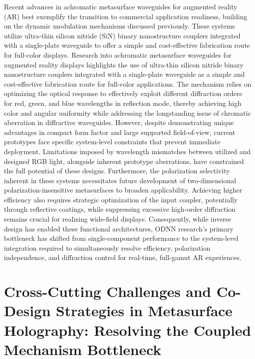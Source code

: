 \documentclass[11pt]{article}
\begin{document}
Recent advances in achromatic metasurface waveguides for augmented reality (AR) best exemplify the transition to commercial application readiness, building on the dynamic modulation mechanisms discussed previously. These systems utilize ultra-thin silicon nitride (SiN) binary nanostructure couplers integrated with a single-plate waveguide to offer a simple and cost-effective fabrication route for full-color displays. Research into achromatic metasurface waveguides for augmented reality displays highlights the use of ultra-thin silicon nitride binary nanostructure couplers integrated with a single-plate waveguide as a simple and cost-effective fabrication route for full-color applications. \citep{doi_10_1038_s41377_025_01761_w_a73a6b84} The mechanism relies on optimizing the optical response to effectively exploit different diffraction orders for red, green, and blue wavelengths in reflection mode, thereby achieving high color and angular uniformity while addressing the longstanding issue of chromatic aberration in diffractive waveguides. However, despite demonstrating unique advantages in compact form factor and large supported field-of-view, current prototypes face specific system-level constraints that prevent immediate deployment. Limitations imposed by wavelength mismatches between utilized and designed RGB light, alongside inherent prototype aberrations, have constrained the full potential of these designs. Furthermore, the polarization selectivity inherent in these systems necessitates future development of two-dimensional polarization-insensitive metasurfaces to broaden applicability. Achieving higher efficiency also requires strategic optimization of the input coupler, potentially through reflective coatings, while suppressing excessive high-order diffraction remains crucial for realizing wide-field displays. Consequently, while inverse design has enabled these functional architectures, ODNN research's primary bottleneck has shifted from single-component performance to the system-level integration required to simultaneously resolve efficiency, polarization independence, and diffraction control for real-time, full-gamut AR experiences. \citep{doi_10_1038_s41377_025_01761_w_a73a6b84}

\section{Cross-Cutting Challenges and Co-Design Strategies in Metasurface Holography: Resolving the Coupled Mechanism Bottleneck}\label{cross-cutting-challenges-and-co-design-strategies-in-metasurface-holography-resolving-the-coupled-mechanism-bottleneck}
\end{document}
